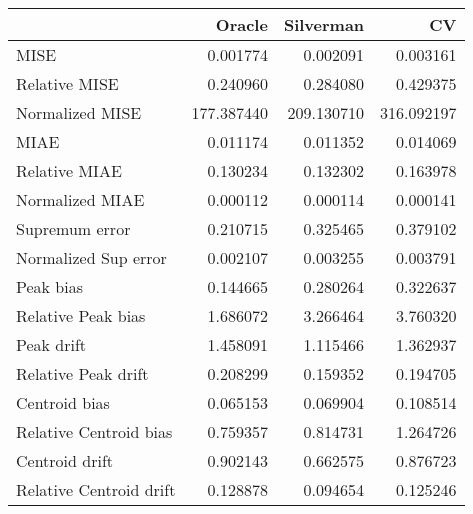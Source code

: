 \begin{tabular}{lrrr}
  \toprule
 & Oracle & Silverman & CV \\ 
  \midrule
MISE & 0.001774 & 0.002091 & 0.003161 \\ 
  Relative MISE & 0.240960 & 0.284080 & 0.429375 \\ 
  Normalized MISE & 177.387440 & 209.130710 & 316.092197 \\ 
  MIAE & 0.011174 & 0.011352 & 0.014069 \\ 
  Relative MIAE & 0.130234 & 0.132302 & 0.163978 \\ 
  Normalized MIAE & 0.000112 & 0.000114 & 0.000141 \\ 
  Supremum error & 0.210715 & 0.325465 & 0.379102 \\ 
  Normalized Sup error & 0.002107 & 0.003255 & 0.003791 \\ 
  Peak bias & 0.144665 & 0.280264 & 0.322637 \\ 
  Relative Peak bias & 1.686072 & 3.266464 & 3.760320 \\ 
  Peak drift & 1.458091 & 1.115466 & 1.362937 \\ 
  Relative Peak drift & 0.208299 & 0.159352 & 0.194705 \\ 
  Centroid bias & 0.065153 & 0.069904 & 0.108514 \\ 
  Relative Centroid bias & 0.759357 & 0.814731 & 1.264726 \\ 
  Centroid drift & 0.902143 & 0.662575 & 0.876723 \\ 
  Relative Centroid drift & 0.128878 & 0.094654 & 0.125246 \\ 
   \bottomrule
\end{tabular}
